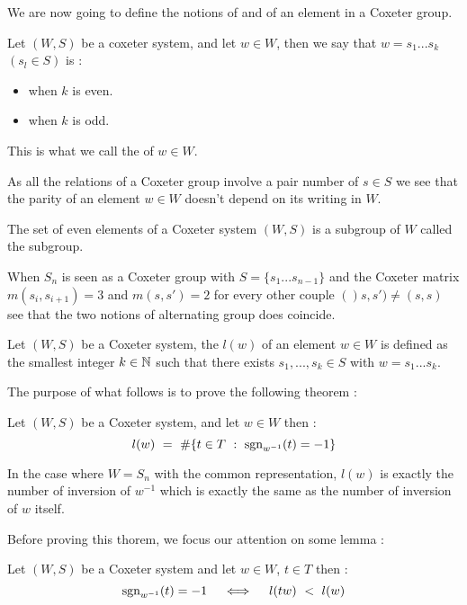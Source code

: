 	We are now going to define the notions of  and  of an element in a Coxeter group. 
	\begin{definition}
		Let $(W,S)$ be a coxeter system, and let $w\in W$, then we say that $w=s_1...s_k$ $(s_l\in S)$ is :
		\begin{itemize}
			\item {} when $k$ is even.
			\item {} when $k$ is odd.
		\end{itemize}
	This is what we call the  of $w\in W$.
	\end{definition}
\begin{remark}
	As all the relations of a Coxeter group involve a pair number of $s\in S$ we see that the parity of an element $w\in W$ doesn't depend on its writing in $W$.
\end{remark}
The set of even elements of a Coxeter system $(W,S)$ is a subgroup of $W$ called the  subgroup. 
\begin{remark}
	When $S_n$ is seen as a Coxeter group with $S=\{s_1...s_{n-1}\}$ and the Coxeter matrix $m(s_i,s_{i+1})=3$ and $m(s,s')=2$ for every other couple $()s,s')\not=(s,s)$ see that the two notions of alternating group does coincide.
\end{remark}
\begin{definition}
	Let $(W,S)$ be a Coxeter system, the  $l(w)$ of an element $w\in W$ is defined as the smallest integer $k\in \mathbb N$ such that there exists $s_1,...,s_k\in S$ with $w=s_1...s_k$.
\end{definition}
The purpose of what follows is to prove the following theorem :
\begin{theorem}\label{theorem sur le calcul des longueurs}
	Let $(W,S)$ be a Coxeter system, and let $w\in W$ then :
	\begin{equation}
	l(w)\text{ }=\text{ } \#\{t\in T\text{ } :\text{ } \mbox{sgn}_{w^{-1}}(t)=-1\}
	\end{equation}
\end{theorem}
\begin{example}
	In the case where $W=S_n$ with the common representation, $l(w)$ is exactly the number of inversion of $w^{-1}$ which is exactly the same as the number of inversion of $w$ itself.
\end{example}
Before proving this thorem, we focus our attention on some lemma :
\begin{lemma}\label{le lemme de la longueur de tw}
	Let $(W,S)$ be a Coxeter system and let $w\in W$, $t\in T$ then :
	\begin{equation}
	\mbox{sgn}_{w^{-1}}(t)=-1\quad \iff \quad l(tw)\text{ }<\text{ } l(w)
	\end{equation}
\end{lemma}
